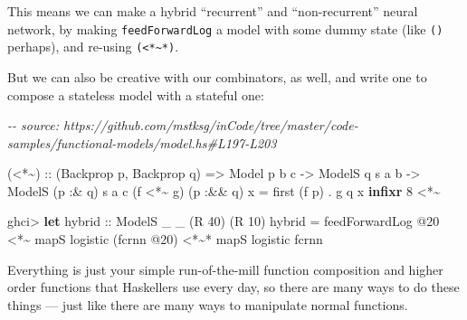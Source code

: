 \documentclass[]{article}
\newenvironment{Shaded}{}{}
\newcommand{\CommentTok}[1]{\textcolor[rgb]{0.38,0.63,0.69}{\textit{#1}}}
\newcommand{\DataTypeTok}[1]{\textcolor[rgb]{0.56,0.13,0.00}{#1}}
\newcommand{\DecValTok}[1]{\textcolor[rgb]{0.25,0.63,0.44}{#1}}
\newcommand{\KeywordTok}[1]{\textcolor[rgb]{0.00,0.44,0.13}{\textbf{#1}}}
\newcommand{\NormalTok}[1]{#1}
\newcommand{\OperatorTok}[1]{\textcolor[rgb]{0.40,0.40,0.40}{#1}}
\newcommand{\OtherTok}[1]{\textcolor[rgb]{0.00,0.44,0.13}{#1}}
\begin{document}
This means we can make a hybrid ``recurrent'' and ``non-recurrent'' neural
network, by making \texttt{feedForwardLog\textquotesingle{}} a model with some
dummy state (like \texttt{()} perhaps), and re-using
\texttt{(\textless{}*\textasciitilde{}*)}.

But we can also be creative with our combinators, as well, and write one to
compose a stateless model with a stateful one:

\begin{Shaded}
\begin{Highlighting}[]
\CommentTok{{-}{-} source: https://github.com/mstksg/inCode/tree/master/code{-}samples/functional{-}models/model.hs\#L197{-}L203}

\NormalTok{(}\OperatorTok{\textless{}*\textasciitilde{}}\NormalTok{)}
\OtherTok{  ::}\NormalTok{ (}\DataTypeTok{Backprop}\NormalTok{ p, }\DataTypeTok{Backprop}\NormalTok{ q)}
    \OtherTok{=\textgreater{}} \DataTypeTok{Model}\NormalTok{   p         b c}
    \OtherTok{{-}\textgreater{}} \DataTypeTok{ModelS}\NormalTok{       q  s a b}
    \OtherTok{{-}\textgreater{}} \DataTypeTok{ModelS}\NormalTok{ (p }\OperatorTok{:\&}\NormalTok{ q) s a c}
\NormalTok{(f }\OperatorTok{\textless{}*\textasciitilde{}}\NormalTok{ g) (p }\OperatorTok{:\&\&}\NormalTok{ q) x }\OtherTok{=}\NormalTok{ first (f p) }\OperatorTok{.}\NormalTok{ g q x}
\KeywordTok{infixr} \DecValTok{8} \OperatorTok{\textless{}*\textasciitilde{}}
\end{Highlighting}
\end{Shaded}

\begin{Shaded}
\begin{Highlighting}[]
\NormalTok{ghci}\OperatorTok{\textgreater{}} \KeywordTok{let}\OtherTok{ hybrid ::} \DataTypeTok{ModelS}\NormalTok{ \_ \_ (}\DataTypeTok{R} \DecValTok{40}\NormalTok{) (}\DataTypeTok{R} \DecValTok{10}\NormalTok{)}
\NormalTok{          hybrid }\OtherTok{=}\NormalTok{ feedForwardLog\textquotesingle{} }\OperatorTok{@}\DecValTok{20}
              \OperatorTok{\textless{}*\textasciitilde{}}\NormalTok{  mapS logistic (fcrnn }\OperatorTok{@}\DecValTok{20}\NormalTok{)}
              \OperatorTok{\textless{}*\textasciitilde{}*}\NormalTok{ mapS logistic fcrnn}
\end{Highlighting}
\end{Shaded}

Everything is just your simple run-of-the-mill function composition and higher
order functions that Haskellers use every day, so there are many ways to do
these things --- just like there are many ways to manipulate normal functions.
\end{document}
